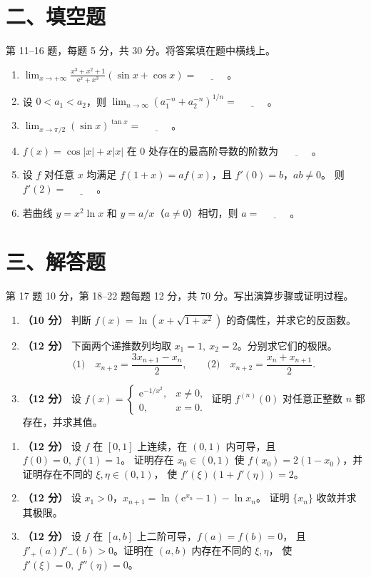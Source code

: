 \documentclass[UTF8,a4paper,zihao=-4,fontset=fandol]{ctexart}
\newcommand{\blank}{\underline{\hspace{3em}}}
\newcommand{\fillsection}{%
  \section*{二、填空题}
  第 11--16 题，每题 5 分，共 30 分。将答案填在题中横线上。}
\newcommand{\solvesection}{%
  \newpage
  \section*{三、解答题}
  第 17 题 10 分，第 18--22 题每题 12 分，共 70 分。写出演算步骤或证明过程。}
\begin{document}
\fillsection
\begin{enumerate}[start=11]
\item $\displaystyle\lim_{x\to+\infty}\frac{x^3+x^2+1}{\mathrm{e}^x+x^3}(\sin x+\cos x)=\blank$。
\item 设 $0<a_1<a_2$，则 $\displaystyle\lim_{n\to\infty}(a_1^{-n}+a_2^{-n})^{1/n}=\blank$。
\item $\displaystyle\lim_{x\to\pi/2}(\sin x)^{\tan x}=\blank$。
\item $f(x)=\cos|x|+x|x|$ 在 $0$ 处存在的最高阶导数的阶数为 $\blank$。
\item 设 $f$ 对任意 $x$ 均满足 $f(1+x)=af(x)$，且 $f'(0)=b$，$ab\ne0$。
则 $f'(2)=\blank$。
\item 若曲线 $y=x^2\ln x$ 和 $y=a/x$（$a\ne0$）相切，则 $a=\blank$。
\end{enumerate}
\solvesection
\begin{enumerate}[start=17]
\item \textbf{（10 分）} 判断 $f(x)=\ln(x+\sqrt{1+x^2})$ 的奇偶性，并求它的反函数。
\vspace{4.5cm}
\item \textbf{（12 分）} 下面两个递推数列均取 $x_1=1,\ x_2=2$。分别求它们的极限。
\[
  \text{(1)}\quad x_{n+2}=\frac{3x_{n+1}-x_n}{2},
  \qquad
  \text{(2)}\quad x_{n+2}=\frac{x_n+x_{n+1}}{2}.
\]
\vspace{4.5cm}
\item \textbf{（12 分）} 设 $f(x)=\begin{cases}\mathrm{e}^{-1/x^2},&x\ne0,\\0,&x=0.\end{cases}$
证明 $f^{(n)}(0)$ 对任意正整数 $n$ 都存在，并求其值。
\end{enumerate}
\newpage
\begin{enumerate}[start=20]
\item \textbf{（12 分）} 设 $f$ 在 $[0,1]$ 上连续，在 $(0,1)$ 内可导，且 $f(0)=0,\ f(1)=1$。
证明存在 $x_0\in(0,1)$ 使 $f(x_0)=2(1-x_0)$，并证明存在不同的 $\xi,\eta\in(0,1)$，
使 $f'(\xi)(1+f'(\eta))=2$。
\vspace{5.5cm}
\item \textbf{（12 分）} 设 $x_1>0$，$x_{n+1}=\ln(\mathrm{e}^{x_n}-1)-\ln x_n$。
证明 $\{x_n\}$ 收敛并求其极限。
\vspace{5.5cm}
\item \textbf{（12 分）} 设 $f$ 在 $[a,b]$ 上二阶可导，$f(a)=f(b)=0$，
且 $f'_+(a)f'_-(b)>0$。证明在 $(a,b)$ 内存在不同的 $\xi,\eta$，
使 $f'(\xi)=0,\ f''(\eta)=0$。
\end{enumerate}
\end{document}
